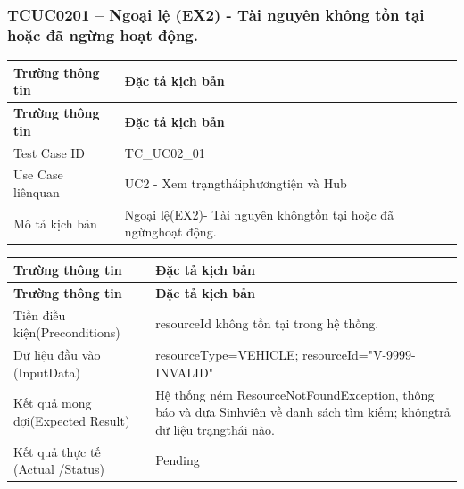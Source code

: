 \subsubsection{TCUC0201 – Ngoại lệ (EX2) - Tài nguyên không tồn tại hoặc đã ngừng hoạt động.}
\begin{longtable}{|L{0.24\textwidth}|L{0.70\textwidth}|}
\hline
\textbf{Trường thông tin} & \textbf{Đặc tả kịch bản} \\
\hline
\endfirsthead
\hline
\textbf{Trường thông tin} & \textbf{Đặc tả kịch bản} \\
\hline
\endhead
Test Case ID & TC\_UC02\_01 \\
\hline
Use Case liênquan & UC2 - Xem trạngtháiphươngtiện và Hub \\
\hline
Mô tả kịch bản & Ngoại lệ(EX2)- Tài nguyên khôngtồn tại hoặc đã ngừnghoạt động. \\
\hline
\end{longtable}
\vspace{-0.5\baselineskip}
\begin{longtable}{|L{0.24\textwidth}|L{0.70\textwidth}|}
\hline
\textbf{Trường thông tin} & \textbf{Đặc tả kịch bản} \\
\hline
\endfirsthead
\hline
\textbf{Trường thông tin} & \textbf{Đặc tả kịch bản} \\
\hline
\endhead
Tiền điều kiện\newline (Preconditions) & resourceId không tồn tại trong hệ thống. \\
\hline
Dữ liệu đầu vào (Input\newline Data) & resourceType=VEHICLE; resourceId="V-9999-INVALID" \\
\hline
Kết quả mong đợi\newline (Expected Result) & Hệ thống ném ResourceNotFoundException, thông báo và đưa Sinh\newline viên về danh sách tìm kiếm; khôngtrả dữ liệu trạngthái nào. \\
\hline
Kết quả thực tế (Actual /\newline Status) & Pending \\
\hline
\end{longtable}
\vspace{-0.5\baselineskip}
